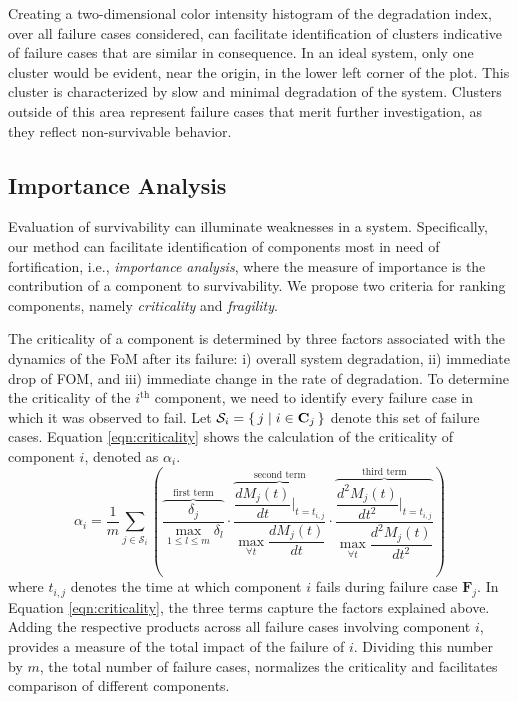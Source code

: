 \documentclass[review]{elsarticle}
\begin{document}
Creating a two-dimensional color intensity histogram of the degradation index, over all failure cases considered, can facilitate identification of clusters indicative of failure cases that are similar in consequence. In an ideal system, only one cluster would be evident, near the origin, in the lower left corner of the plot. This cluster is characterized by slow and minimal degradation of the system. Clusters outside of this area represent failure cases that merit further investigation, as they reflect non-survivable behavior.

\subsection{Importance Analysis}
\label{sec:approach:importance}
Evaluation of survivability can illuminate weaknesses in a system. Specifically, our method can facilitate identification of components most in need of fortification, i.e., \emph{importance analysis}, where the measure of importance is the contribution of a component to survivability. We propose two criteria for ranking components, namely \emph{criticality} and \emph{fragility}.

The criticality of a component is determined by three factors associated with the dynamics of the FoM after its failure: i) overall system degradation, ii) immediate drop of FOM, and iii) immediate change in the rate of degradation. To determine the criticality of the $i^\mathrm{th}$ component, we need to identify every failure case in which it was observed to fail. Let $\mathcal{S}_i = \set{j | i \in \mathbf{C}_j}$ denote this set of failure cases. Equation \eqref{eqn:criticality} shows the calculation of the criticality of component $i$, denoted as $\alpha_i$.
\small
\begin{equation}
\label{eqn:criticality}
\alpha_i =
\frac{1}{m}
\sum\limits_{j \in \mathcal{S}_i}
\left(
\overbrace
  {\dfrac
    {\delta_j}
    {\max\limits_{1 \leq l \leq m} \delta_l}
  }
  ^{\text{first term}}\cdot
\overbrace
  {\dfrac
    {\dfrac{d M_j(t)}{dt}\Big|_{t=t_{i, j}}}
    {\max\limits_{\forall t}\dfrac{d M_j(t)}{dt}}
  }
  ^{\text{second term}}\cdot
\overbrace
  {\dfrac
    {\dfrac{d^2 M_j(t)}{dt^2}\Big|_{t=t_{i, j}}}
    {\max\limits_{\forall t}\dfrac{d^2 M_j(t)}{dt^2}}
  }
  ^{\text{third term}}
\right)
\end{equation}
\normalsize
where $t_{i, j}$ denotes the time at which component $i$ fails during failure case $\mathbf{F}_j$. In Equation \eqref{eqn:criticality}, the three terms capture the factors explained above. Adding the respective products across all failure cases involving component $i$, provides a measure of the total impact of the failure of $i$. Dividing this number by $m$, the total number of failure cases, normalizes the criticality and facilitates comparison of different components.
\end{document}
